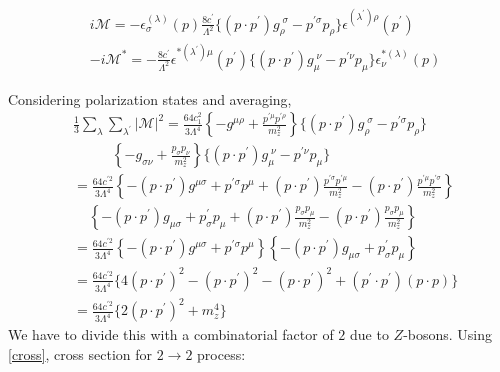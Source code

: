 \documentclass[12pt]{report}
\begin{document}
\begin{align*}
&i \mathcal{M}=- \epsilon^{(\lambda)}_\sigma (p) \frac{8c^\prime}{\Lambda^2} \{(p\cdot p^\prime) g_\rho^{\;\sigma}-p^{\prime \sigma} p_\rho\} \epsilon^{ (\lambda^\prime) \rho}(p^\prime)\\
&-i \mathcal{M}^* = - \frac{8c^\prime}{\Lambda^2} \epsilon^{*(\lambda^\prime) \mu}(p^\prime) \{(p\cdot p^\prime) g^{\;\nu}_\mu -p^{\prime \nu} p_\mu \} \epsilon^{*(\lambda)}_\nu (p)
\end{align*}

Considering polarization states and averaging,
\begin{align*}
& \frac{1}{3} \sum_\lambda \sum_{\lambda^\prime} |\mathcal{M}|^2  = \frac{64 c^2_1}{3\Lambda^4} \left\{-g^{\mu \rho} + \frac{p^{\prime \mu} p^{\prime \rho}}{m^2_z} \right\}\{(p\cdot p^\prime) g_\rho^{\;\sigma}-p^{\prime \sigma} p_\rho\}\\ 
&\;\;\;\;\;\;\;\;\;\; \left\{ -g_{\sigma \nu} +\frac{p_\sigma p_\nu}{m^2_z} \right\} \{(p\cdot p^\prime) g^{\;\nu}_\mu -p^{\prime \nu} p_\mu \}\\
& =\frac{64 c^{\prime2}}{3\Lambda^4} \left\{-(p \cdot p^\prime) g^{\mu \sigma} +p^{\prime \sigma} p^{\mu} +(p \cdot p^\prime) \frac{p^{\prime \sigma} p^{\prime \mu}}{m^2_z} -(p\cdot p^\prime) \frac{p^{\prime \mu} p^{\prime \sigma}}{m^2_z} \right\}\\
& \;\;\;\; \left\{-(p \cdot p^\prime) g_{\mu \sigma}+p^\prime_\sigma p_\mu +(p \cdot p^\prime) \frac{p_\sigma p_\mu}{m^2_z} -(p \cdot p^\prime) \frac{p_\sigma p_\mu}{m^2_z}   \right\} \\
&=\frac{64 c^{\prime 2}}{3\Lambda^4} \left\{-(p \cdot p^\prime) g^{\mu \sigma} + p^{\prime \sigma} p^\mu \right\} \left\{-(p \cdot p^\prime) g_{\mu \sigma} + p^\prime_\sigma p_\mu \right\}\\
& =\frac{64 c^{\prime 2}}{3\Lambda^4}  \{ 4(p \cdot p^\prime)^2 - (p \cdot p^\prime)^2 -(p \cdot p^\prime)^2 + (p^\prime \cdot p^\prime) (p \cdot p)  \} \\
&  =\frac{64 c^{\prime 2}}{3\Lambda^4} \{ 2(p \cdot p^\prime)^2 +m_z^4\}
\end{align*}
We have to divide this with a combinatorial factor of $2$ due to $Z$-bosons. Using \ref{cross}, cross section for $2 \longrightarrow 2$ process:
\end{document}
